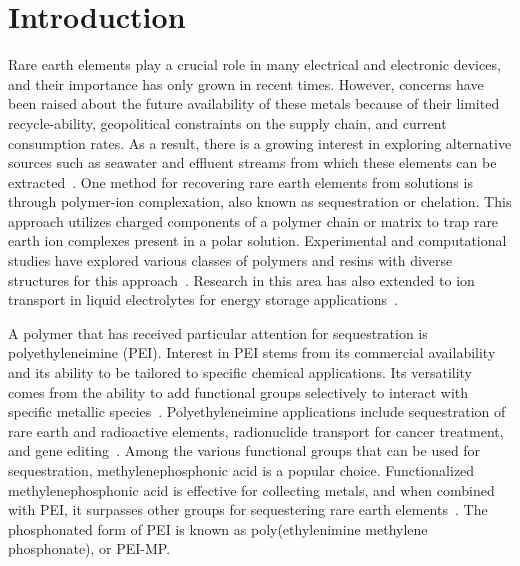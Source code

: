 \documentclass[
journal=jcisd8, %
manuscript=article,
layout=twocolumn   %
]{achemso}
\begin{document}
\maketitle

\section{Introduction}

Rare earth elements play a crucial role in many electrical and electronic devices, and their importance has only grown in recent times. However, concerns have been raised about the future availability of these metals because of their limited recycle-ability, geopolitical constraints on the supply chain, and current consumption rates. As a result, there is a growing interest in exploring alternative sources such as seawater and effluent streams from which these elements can be extracted~\cite{Diallo2015, Archer2020, Sener2021, Barakat2010}. One method for recovering rare earth elements from solutions is through polymer-ion complexation, also known as sequestration or chelation. This approach utilizes charged components of a polymer chain or matrix to trap rare earth ion complexes present in a polar solution. Experimental and computational studies have explored various classes of polymers and resins with diverse structures for this approach~\cite{Abderrahim2006, Archer2020,  Archer2021, Archer2022Resins, Hu2017, Adel2010, Fllorek2015}. Research in this area has also extended to ion transport in liquid electrolytes for energy storage applications~\cite{Wang2016, Ketkar2019}.

A polymer that has received particular attention for sequestration is polyethyleneimine (PEI). Interest in PEI stems from its commercial availability and its ability to be tailored to specific chemical applications. Its versatility comes from the ability to add functional groups selectively to interact with specific metallic species~\cite{Archer2020, Zhao2020, Abderrahim2006, Zhao2020}. Polyethyleneimine applications include sequestration of rare earth and radioactive elements, radionuclide transport for cancer treatment, and gene editing~\cite{Sun2011, Andreoli2014, Popwell2014, Zhu2015}. Among the various functional groups that can be used for sequestration, methylenephosphonic acid is a popular choice. Functionalized methylenephosphonic acid is effective for collecting metals, and when combined with PEI, it surpasses other groups for sequestering rare earth elements~\cite{Archer2022Resins, Popwell2014, Zhu2015, Abderrahim2006,Archer2020}. The phosphonated form of PEI is known as poly(ethylenimine methylene phosphonate), or PEI-MP. 
\end{document}
